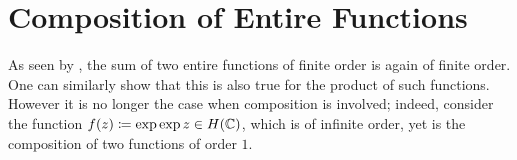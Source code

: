 \chapter{Composition of Entire Functions}
\label{ch:composition-entire-functions}

As seen by , the sum of two entire functions of finite order is again of finite order. One can similarly show that this is also true for the product of such functions. However it is no longer the case when composition is involved; indeed, consider the function $f(z) \coloneqq \exp \exp z \in H(\mathbb{C})$, which is of infinite order, yet is the composition of two functions of order $1$. 

